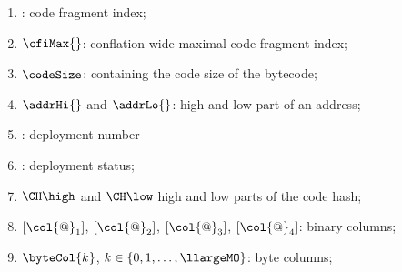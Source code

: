 \begin{enumerate}
	\item \cfi{}: code fragment index;
	\item $\cfiMax{}$: conflation-wide maximal code fragment index;
	\item $\codeSize$: containing the code size of the bytecode;
	\item $\addrHi{}$ and $\addrLo{}$: high and low part of an address;
	\item \depNum{}: deployment number
	\item \depStatus{}: deployment status;
	\item $\CH\high$ and $\CH\low$ high and low parts of the code hash;
	\item $[\col{@}_{1}]$, $[\col{@}_{2}]$, $[\col{@}_{3}]$, $[\col{@}_{4}]$: binary columns;
	\item $\byteCol{k}$, $k\in\{0, 1,\dots,\llargeMO\}$: byte columns;
\end{enumerate}
